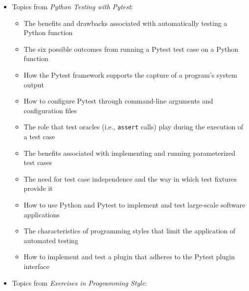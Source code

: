 \documentclass[11pt]{article}
\newcommand{\programmingstyle}{{\em Exercises in Programming Style\/}}
\newcommand{\pytest}{{\em Python Testing with Pytest\/}}
\newcommand{\program}[1]{\lstinline{#1}}
\begin{document}
\begin{itemize}
\begin{itemize}
    \end{itemize}

  \item Topics from \pytest{}:
    \vspace*{-.05in}
    \begin{itemize}

      \itemsep 0.1in

      \item The benefits and drawbacks associated with automatically testing a
        Python function

      \item The six possible outcomes from running a Pytest test case on a
        Python function

      \item How the Pytest framework supports the capture of a program's system
        output

      \item How to configure Pytest through command-line arguments and
        configuration files

      \item The role that test oracles (i.e., \program{assert} calls) play
        during the execution of a test case

      \item The benefits associated with implementing and running parameterized
        test cases

      \item The need for test case independence and the way in which test
        fixtures provide it

      \item How to use Python and Pytest to implement and test large-scale
        software applications

      \item The characteristics of programming styles that limit the application
        of automated testing

      \item How to implement and test a plugin that adheres to the Pytest plugin
        interface

    \end{itemize}

  \item Topics from \programmingstyle{}:
    \vspace*{-.05in}
    \begin{itemize}

      \itemsep 0.1in


\end{itemize}
\end{itemize}
\end{document}
